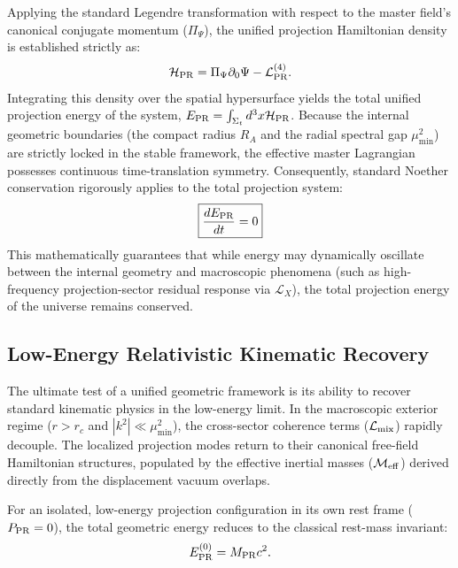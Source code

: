 \documentclass[11pt]{article}
\begin{document}
Applying the standard Legendre transformation \cite{goldstein2002} with respect to the master field's canonical conjugate momentum ($\Pi_\Psi$), the unified projection Hamiltonian density \cite{ peskin1995introduction} is established strictly as:
\begin{equation}
\mathcal{H}_{\rm PR} = \Pi_\Psi \partial_0 \Psi - \mathcal{L}_{\rm PR}^{(4)}.
\end{equation}
Integrating this density over the spatial hypersurface yields the total unified projection energy of the system, $E_{\rm PR} = \int_{\Sigma_t} d^3x \mathcal{H}_{\rm PR}$. Because the internal geometric boundaries (the compact radius $R_A$ and the radial spectral gap $\mu_{\min}^2$) are strictly locked in the stable framework, the effective master Lagrangian possesses continuous time-translation symmetry. Consequently, standard Noether conservation \cite{noether1918} rigorously applies to the total projection system:
\begin{equation}
\boxed{ \frac{d E_{\rm PR}}{dt} = 0 }
\end{equation}
This mathematically guarantees that while energy may dynamically oscillate between the internal geometry and macroscopic phenomena (such as high-frequency projection-sector residual response via $\mathcal{L}_X$), the total projection energy of the universe remains conserved.

\subsection{Low-Energy Relativistic Kinematic Recovery}
\label{sec:relativistic_kinematic_recovery}

The ultimate test of a unified geometric framework is its ability to recover standard kinematic physics in the low-energy limit. In the macroscopic exterior regime ($r > r_c$ and $|k^2| \ll \mu_{\min}^2$), the cross-sector coherence terms ($\mathcal{L}_{\rm mix}$) rapidly decouple. The localized projection modes return to their canonical free-field Hamiltonian structures, populated by the effective inertial masses ($\mathcal M_{\rm eff}$) derived directly from the displacement vacuum overlaps.

For an isolated, low-energy projection configuration in its own rest frame ($P_{\rm PR} = 0$), the total geometric energy reduces to the classical rest-mass invariant:
\begin{equation}
E_{\rm PR}^{(0)} = M_{\rm PR} c^2.
\end{equation}
\end{document}
